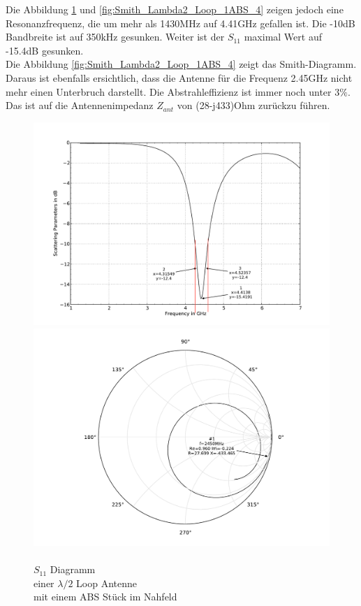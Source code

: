 Die Abbildung \ref{fig:S11_Lambda2_Loop_1ABS_3} und \ref{fig:Smith_Lambda2_Loop_1ABS_4} zeigen jedoch eine Resonanzfrequenz, die um mehr als 1430MHz auf 4.41GHz gefallen ist. Die -10dB Bandbreite ist auf 350kHz gesunken. Weiter ist der $S_{11}$ maximal Wert auf -15.4dB gesunken.\\
Die Abbildung \ref{fig:Smith_Lambda2_Loop_1ABS_4} zeigt das Smith-Diagramm. Daraus ist ebenfalls ersichtlich, dass die Antenne für die Frequenz 2.45GHz nicht mehr einen Unterbruch darstellt. Die Abstrahleffizienz ist immer noch unter $3\%$. Das ist auf die Antennenimpedanz $Z_{ant}$ von (28-j433)Ohm zurückzu führen.

\begin{figure}[!h]
\begin{center}
  \includegraphics[width=\linewidth]{content/bilder/Evaluation/Loop/L2/1ABS/S11_Loop_Lambda2_mitABS.pdf}
  \caption{\\$S_{11}$ Diagramm \\einer $\lambda/2$ Loop Antenne \\mit einem ABS Stück im Nahfeld}\label{fig:S11_Lambda2_Loop_1ABS_3}
\endminipage%
{}
  \includegraphics[width=\linewidth]{content/bilder/Evaluation/Loop/L2/1ABS/Smith_Loop_Lambda2_mitABS.pdf}

\end{center}
\end{figure}
